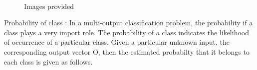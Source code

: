 \documentclass[conference]{IEEEtran}
\begin{document}
\begin{figure}[!t]
\centering
{} 
\hfil
{}
\hfil
{}
\hfil
{} \\
{}
\hfil
{}
\hfil
{}
\hfil
{}
\hfil


\caption{Images provided}
\label{fig_sim}

\end{figure}



Probability of class \cite {probability distribution} : In a multi-output classification problem, the probability if a class plays a very import role. The probability of a class indicates the likelihood of occurrence of a particular class. Given a particular unknown input, the corresponding output vector O, then the estimated probabilty that it belongs to each class is given as follows.
\end{document}
